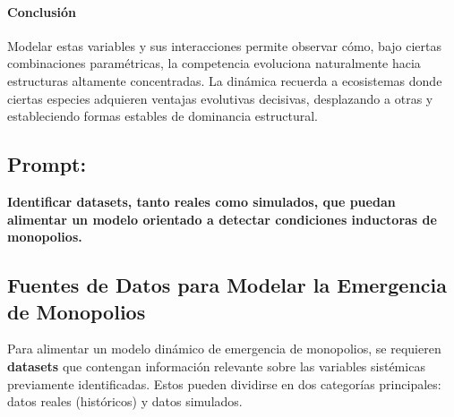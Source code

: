 \documentclass[a4paper,12pt]{article}
\begin{document}
\paragraph{Conclusión} Modelar estas variables y sus interacciones permite observar cómo, bajo ciertas combinaciones paramétricas, la competencia evoluciona naturalmente hacia estructuras altamente concentradas. La dinámica recuerda a ecosistemas donde ciertas especies adquieren ventajas evolutivas decisivas, desplazando a otras y estableciendo formas estables de dominancia estructural.

\subsection*{Prompt:}
\textbf{Identificar datasets, tanto reales como simulados, que puedan alimentar un modelo orientado a detectar condiciones inductoras de monopolios.}
\subsection*{Fuentes de Datos para Modelar la Emergencia de Monopolios}

Para alimentar un modelo dinámico de emergencia de monopolios, se requieren \textbf{datasets} que contengan información relevante sobre las variables sistémicas previamente identificadas. Estos pueden dividirse en dos categorías principales: datos reales (históricos) y datos simulados.
\end{document}
